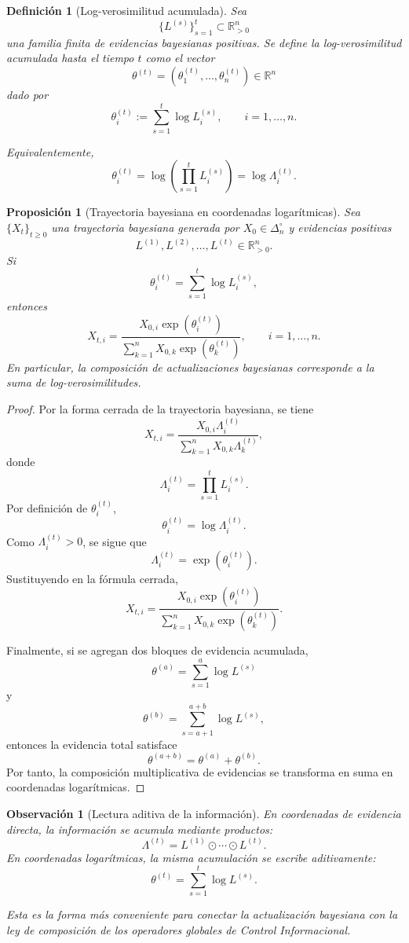 \documentclass[12pt]{article}
\newtheorem{definicion}{Definición}[section]
\newtheorem{proposicion}{Proposición}[section]
\newtheorem{observacion}{Observación}[section]
\begin{document}
\begin{definicion}[Log-verosimilitud acumulada]
Sea
\[
\{L^{(s)}\}_{s=1}^{t}\subset \mathbb{R}_{>0}^{n}
\]
una familia finita de evidencias bayesianas positivas. Se define la
\emph{log-verosimilitud acumulada} hasta el tiempo \(t\) como el vector
\[
\theta^{(t)}=(\theta_1^{(t)},\dots,\theta_n^{(t)})\in\mathbb{R}^{n}
\]
dado por
\[
\theta_i^{(t)}
:=
\sum_{s=1}^{t}\log L_i^{(s)},
\qquad
i=1,\dots,n.
\]

Equivalentemente,
\[
\theta_i^{(t)}
=
\log\left(\prod_{s=1}^{t}L_i^{(s)}\right)
=
\log \Lambda_i^{(t)}.
\]
\end{definicion}

\begin{proposicion}[Trayectoria bayesiana en coordenadas logarítmicas]
Sea \(\{X_t\}_{t\geq 0}\) una trayectoria bayesiana generada por
\(X_0\in\Delta_n^\circ\) y evidencias positivas
\[
L^{(1)},L^{(2)},\dots,L^{(t)}\in\mathbb{R}_{>0}^{n}.
\]
Si
\[
\theta_i^{(t)}
=
\sum_{s=1}^{t}\log L_i^{(s)},
\]
entonces
\[
X_{t,i}
=
\frac{
X_{0,i}\exp(\theta_i^{(t)})
}{
\sum_{k=1}^{n}X_{0,k}\exp(\theta_k^{(t)})
},
\qquad
i=1,\dots,n.
\]
En particular, la composición de actualizaciones bayesianas corresponde a la suma de
log-verosimilitudes.
\end{proposicion}

\begin{proof}
Por la forma cerrada de la trayectoria bayesiana, se tiene
\[
X_{t,i}
=
\frac{
X_{0,i}\Lambda_i^{(t)}
}{
\sum_{k=1}^{n}X_{0,k}\Lambda_k^{(t)}
},
\]
donde
\[
\Lambda_i^{(t)}
=
\prod_{s=1}^{t}L_i^{(s)}.
\]
Por definición de \(\theta_i^{(t)}\),
\[
\theta_i^{(t)}
=
\log \Lambda_i^{(t)}.
\]
Como \(\Lambda_i^{(t)}>0\), se sigue que
\[
\Lambda_i^{(t)}
=
\exp(\theta_i^{(t)}).
\]
Sustituyendo en la fórmula cerrada,
\[
X_{t,i}
=
\frac{
X_{0,i}\exp(\theta_i^{(t)})
}{
\sum_{k=1}^{n}X_{0,k}\exp(\theta_k^{(t)})
}.
\]

Finalmente, si se agregan dos bloques de evidencia acumulada,
\[
\theta^{(a)}
=
\sum_{s=1}^{a}\log L^{(s)}
\]
y
\[
\theta^{(b)}
=
\sum_{s=a+1}^{a+b}\log L^{(s)},
\]
entonces la evidencia total satisface
\[
\theta^{(a+b)}
=
\theta^{(a)}+\theta^{(b)}.
\]
Por tanto, la composición multiplicativa de evidencias se transforma en suma en
coordenadas logarítmicas.
\end{proof}

\begin{observacion}[Lectura aditiva de la información]
En coordenadas de evidencia directa, la información se acumula mediante productos:
\[
\Lambda^{(t)}
=
L^{(1)}\odot\cdots\odot L^{(t)}.
\]
En coordenadas logarítmicas, la misma acumulación se escribe aditivamente:
\[
\theta^{(t)}
=
\sum_{s=1}^{t}\log L^{(s)}.
\]

Esta es la forma más conveniente para conectar la actualización bayesiana con la ley de
composición de los operadores globales de Control Informacional.
\end{observacion}
\end{document}
